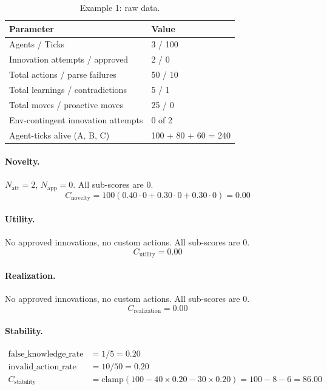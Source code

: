 \documentclass[a4paper, 11pt]{article}
\newcommand{\Natt}{N_{\text{att}}}
\newcommand{\Napp}{N_{\text{app}}}
\begin{document}
\begin{table}[ht]
\centering
\small
\caption{Example 1: raw data.}
\begin{tabular}{@{}ll@{}}
\toprule
\textbf{Parameter} & \textbf{Value} \\
\midrule
Agents / Ticks & 3 / 100 \\
Innovation attempts / approved & 2 / 0 \\
Total actions / parse failures & 50 / 10 \\
Total learnings / contradictions & 5 / 1 \\
Total moves / proactive moves & 25 / 0 \\
Env-contingent innovation attempts & 0 of 2 \\
Agent-ticks alive (A, B, C) & 100 + 80 + 60 = 240 \\
\bottomrule
\end{tabular}
\end{table}

\paragraph{Novelty.} $\Natt = 2$, $\Napp = 0$. All sub-scores are $0$.
\[
    C_{\text{novelty}} = 100(0.40 \cdot 0 + 0.30 \cdot 0 + 0.30 \cdot 0) = \mathbf{0.00}
\]

\paragraph{Utility.} No approved innovations, no custom actions. All sub-scores are $0$.
\[
    C_{\text{utility}} = \mathbf{0.00}
\]

\paragraph{Realization.} No approved innovations, no custom actions. All sub-scores are $0$.
\[
    C_{\text{realization}} = \mathbf{0.00}
\]

\paragraph{Stability.}
\begin{align*}
    \text{false\_knowledge\_rate} &= 1/5 = 0.20 \\
    \text{invalid\_action\_rate} &= 10/50 = 0.20 \\
    C_{\text{stability}} &= \text{clamp}(100 - 40 \times 0.20 - 30 \times 0.20) = 100 - 8 - 6 = \mathbf{86.00}
\end{align*}
\end{document}
